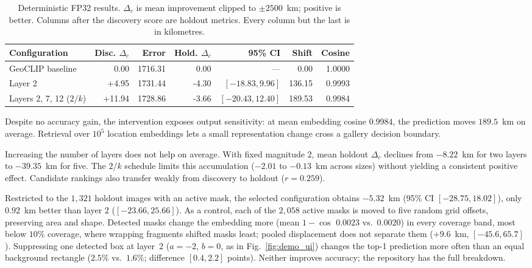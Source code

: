 \begin{table}[t]
\centering
\caption{Deterministic FP32 results. $\Delta_c$ is mean improvement clipped to
$\pm2500$~km; positive is better. Columns after the discovery score are holdout
metrics. Every column but the last is in kilometres.}
\label{tab:main}
\small
\setlength{\tabcolsep}{2.5pt}
\begin{tabular}{l|rrrrrr}
\toprule
\textbf{Configuration} &
\textbf{Disc. $\Delta_c$} & \textbf{Error} & \textbf{Hold. $\Delta_c$} &
\textbf{95\% CI} & \textbf{Shift} & \textbf{Cosine} \\
\midrule
GeoCLIP baseline & 0.00 & 1716.31 & 0.00 & --- & 0.00 & 1.0000 \\
Layer 2 & +4.95 & 1731.44 & -4.30 & $[-18.83,9.96]$ & 136.15 & 0.9993 \\
Layers 2, 7, 12 ($2/k$) & +11.94 & 1728.86 & -3.66 & $[-20.43,12.40]$ & 189.53 & 0.9984 \\
\bottomrule
\end{tabular}
\end{table}

Despite no accuracy gain, the intervention exposes output sensitivity: at
mean embedding cosine $0.9984$, the prediction moves $189.5$~km on average.
Retrieval over $10^5$ location embeddings lets a small representation change
cross a gallery decision boundary.

Increasing the number of layers does not help on average. With fixed magnitude
$2$, mean holdout $\Delta_c$ declines from $-8.22$~km for two layers to
$-39.35$~km for five. The $2/k$ schedule limits this accumulation ($-2.01$ to
$-0.13$~km across sizes) without yielding a consistent positive effect. Candidate rankings also transfer
weakly from discovery to holdout ($r=0.259$).

Restricted to the $1{,}321$ holdout images with an active mask, the selected
configuration obtains $-5.32$~km (95\% CI $[-28.75,18.02]$), only $0.92$~km
better than layer 2 ($[-23.66,25.66]$). As a control, each of the $2{,}058$ active
masks is moved to five random grid offsets, preserving area and shape. Detected masks change the
embedding more (mean $1-\cos$ $0.0023$ vs.\ $0.0020$) in every coverage band,
most below $10\%$ coverage, where wrapping fragments shifted masks least;
pooled displacement does not separate them ($+9.6$~km, $[-45.6,65.7]$).
Suppressing one detected box at layer~2 ($a=-2$, $b=0$, as in
Fig.~\ref{fig:demo_ui}) changes the top-1 prediction more often than an equal
background rectangle ($2.5\%$ vs.\ $1.6\%$; difference $[0.4,2.2]$ points).
Neither improves accuracy; the repository has the full breakdown.
